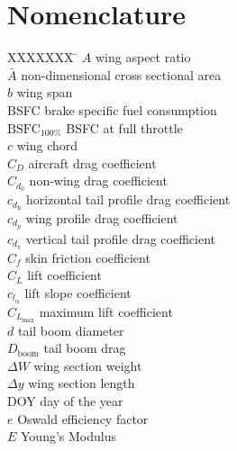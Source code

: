 \section*{Nomenclature}

\begin{multicols}{2}
\small

\begin{tabbing}
  XXXXXXX \= \kill%
$A$ \> wing aspect ratio \\
$\bar{A}$ \> non-dimensional cross sectional area \\
$b$ \> wing span \\ %
BSFC \> brake specific fuel consumption \\ %
$\text{BSFC}_{100\%}$ \> BSFC at full throttle \\ %
$c$ \> wing chord \\ %
$C_D$ \> aircraft drag coefficient \\
$C_{d_0}$ \> non-wing drag coefficient \\
$c_{d_{\text{h}}}$ \> horizontal tail profile drag coefficient \\
$c_{d_p}$ \> wing profile drag coefficient \\
$c_{d_{\text{v}}}$ \> vertical tail profile drag coefficient \\
$C_f$ \> skin friction coefficient \\
$C_L$ \> lift coefficient \\
$c_{l_{\alpha}}$ \> lift slope coefficient \\
$C_{L_{\text{max}}}$ \> maximum lift coefficient \\
$d$ \> tail boom diameter \\ %
$D_{\text{boom}}$ \> tail boom drag \\%
$\Delta W$ \> wing section weight \\ %
$\Delta y$ \> wing section length \\ %
DOY \> day of the year \\
$e$ \> Oswald efficiency factor \\
$E$ \> Young's Modulus \\ %

\end{tabbing}
\end{multicols}
